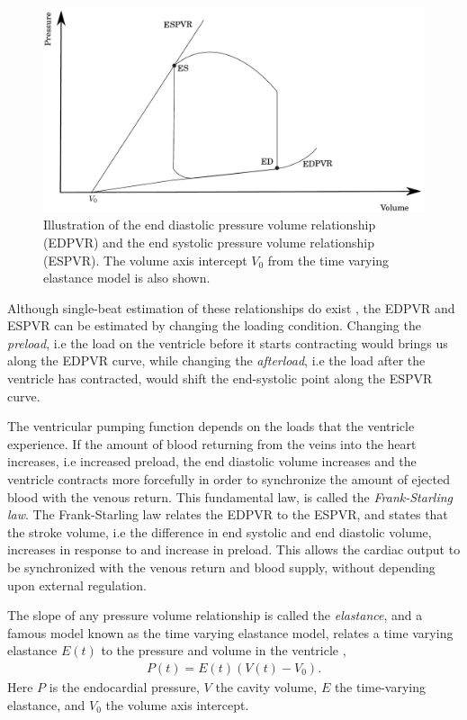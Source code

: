 \begin{figure}[htbp]
  \centering
    \includegraphics[width=\textwidth]{chapters/introduction/figures/pvr.pdf}
\caption{Illustration of the end diastolic pressure volume
  relationship (EDPVR) and the end systolic pressure volume
  relationship (ESPVR). The volume axis intercept $V_0$ from the time
  varying elastance model is also shown. }
\label{fig:intro_pvr}
\end{figure}




Although single-beat estimation of these relationships do
exist \cite{senzaki1996single,klotz2006single}, the EDPVR and ESPVR
can be estimated by changing the loading condition.
Changing the \emph{preload}, i.e the load on the ventricle
before it starts contracting would brings us along the EDPVR
curve, while changing the \emph{afterload}, i.e the load after
the ventricle has contracted, would shift the end-systolic point along
the ESPVR curve.


The ventricular pumping function depends on the loads that the
ventricle experience. If the amount of blood returning from the veins
into the heart increases, i.e increased preload, the end diastolic
volume increases and the ventricle contracts more forcefully in order
to synchronize the amount of ejected blood with the venous
return. This fundamental law, is called the \emph{Frank-Starling
  law}. The Frank-Starling law relates the EDPVR to the ESPVR, and
states that the stroke volume, i.e the difference in end systolic and
end diastolic volume, increases in response to and increase in
preload. This allows the cardiac output to
be synchronized with the venous return and blood supply, without
depending upon external regulation. 


The slope of any pressure volume relationship is called the \emph{elastance},
and a famous model known as the  time varying elastance model, relates
a time varying elastance $E(t)$ to the pressure and volume in the ventricle
\cite{sagawa1977end},  
\begin{align}
  P(t) = E(t)( V(t) - V_0 ).
  \label{eq:time_varying_elastance}
\end{align}
Here $P$ is the endocardial pressure, $V$ the cavity volume, $E$ the
time-varying elastance, and $V_0$ the volume axis intercept.

